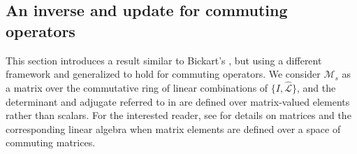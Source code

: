 \documentclass[review]{siamart}
\begin{document}
\subsection{An inverse and update for commuting operators}\label{sec:solve:inv}

This section introduces a result similar to Bickart's \cite{bickart77},
but using a different framework and generalized to hold for commuting
operators. We consider $\mathcal{M}_s$ as a matrix over the commutative
ring of linear combinations of $\{I, \widehat{\mathcal{L}}\}$,
and the determinant and adjugate referred to in  are defined
over matrix-valued elements rather than scalars. For the interested reader,
see \cite{brown1993matrices} for details on matrices and the corresponding
linear algebra when matrix elements are defined over a space of commuting
matrices.
\end{document}
